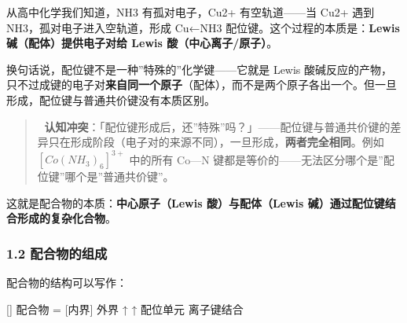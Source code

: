 \documentclass[a4paper,11pt]{ctexart}
\newenvironment{Shaded}{}{}
\newenvironment{Highlighting}{}{}
\newcommand{\NormalTok}[1]{#1}
\begin{document}
从高中化学我们知道，NH3 有孤对电子，Cu2+ 有空轨道------当 Cu2+ 遇到 NH3，孤对电子进入空轨道，形成 Cu←NH3 配位键。这个过程的本质是：\textbf{Lewis 碱（配体）提供电子对给 Lewis 酸（中心离子/原子）}。

换句话说，配位键不是一种''特殊的''化学键------它就是 Lewis 酸碱反应的产物，只不过成键的电子对\textbf{来自同一个原子}（配体），而不是两个原子各出一个。但一旦形成，配位键与普通共价键没有本质区别。

\begin{quote}
🧠 \textbf{认知冲突}：「配位键形成后，还''特殊''吗？」------配位键与普通共价键的差异只在形成阶段（电子对的来源不同），一旦形成，\textbf{两者完全相同}。例如 \([Co(NH_3)_6]^{3+}\) 中的所有 Co---N 键都是等价的------无法区分哪个是''配位键''哪个是''普通共价键''。
\end{quote}

这就是配合物的本质：\textbf{中心原子（Lewis 酸）与配体（Lewis 碱）通过配位键结合形成的复杂化合物}。

\subsubsection{1.2 配合物的组成}\label{ux914dux5408ux7269ux7684ux7ec4ux6210}

配合物的结构可以写作：

\begin{Shaded}
\begin{Highlighting}[]
\NormalTok{配合物 = [内界] 外界}
\NormalTok{          ↑       ↑}
\NormalTok{      配位单元   离子键结合}
\end{Highlighting}
\end{Shaded}
\end{document}
